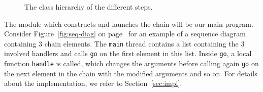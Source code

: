 \begin{figure}
\caption{The class hierarchy of the different steps.} \label{fig:arch}
\end{figure}

The module which constructs and launches the chain will be our main program. Consider Figure~\ref{fig:seq-diag} on page~\pageref{fig:seq-diag} for an example of a sequence diagram containing 3 chain elements. The \verb|main| thread contains a list containing the 3 involved handlers and calls \verb|go| on the first element in this list. Inside \verb|go|, a local function \verb|handle| is called, which changes the arguments before calling again \verb|go| on the next element in the chain with the modified arguments and so on. For details about the implementation, we refer to Section~\ref{sec:impl}.


